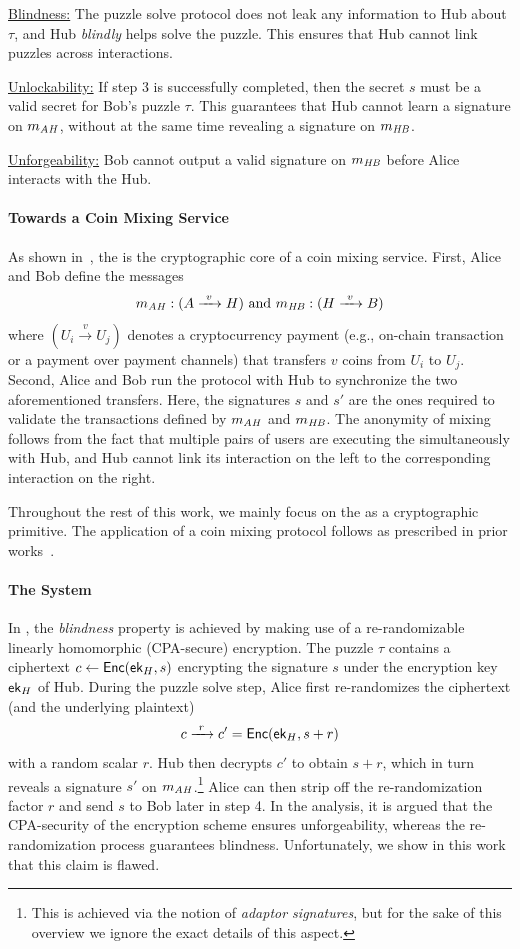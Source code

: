 \smallskip\noindent\underline{Blindness:} The puzzle solve protocol does not leak any information to Hub about $\tau$, and Hub \emph{blindly} helps solve the puzzle. This ensures that Hub cannot link puzzles across interactions.

\smallskip\noindent\underline{Unlockability:} If step 3 is successfully completed, then the secret $s$ must be a valid secret for  Bob's puzzle $\tau$. This guarantees that Hub cannot learn a signature on $m_{\mathit{AH}}$, without at the same time revealing a signature on $m_{\mathit{HB}}$.

\smallskip\noindent\underline{Unforgeability:} Bob cannot output a valid signature on $m_{\mathit{HB}}$ before Alice interacts with the Hub.


{\paragraph{Towards a Coin Mixing Service}
As shown in~\cite{NDSS:HABSG17,SP:TaiMorMaf21},  the \syncpuzzle is the cryptographic core of a coin mixing service. First, Alice and Bob define the messages $$m_{\mathit{AH}}: (A \xrightarrow{~v~} H) \text{ and }m_{\mathit{HB}}: (H \xrightarrow{~v~} B)$$ where $(U_i \xrightarrow{~v~} U_j)$ denotes a cryptocurrency payment (e.g., on-chain transaction or a payment over payment channels) that transfers $v$ coins from $U_i$ to $U_j$. Second, Alice and Bob run the \syncpuzzle protocol with Hub to synchronize the two aforementioned transfers. Here, 
the signatures $s$ and $s'$ are the ones required to validate the transactions defined by $m_{\mathit{AH}}$ and $m_{\mathit{HB}}$. The anonymity of mixing follows from the fact that multiple pairs of users are executing the \syncpuzzle simultaneously with Hub, and Hub cannot link its interaction on the left to the corresponding interaction on the right.}
Throughout the rest of this work, we mainly focus on the \syncpuzzle as a cryptographic primitive. The application of a coin mixing protocol follows as prescribed in prior works~\cite{NDSS:HABSG17,SP:TaiMorMaf21}.


\paragraph{The \aal System} In \aal, the \emph{blindness} property is achieved by making use of a re-randomizable linearly homomorphic (CPA-secure) encryption. The puzzle $\tau$ contains a ciphertext $c \gets {\mathsf{Enc}}(\mathsf{ek}_H,\allowbreak s)$ encrypting the signature $s$ under the encryption key $\mathsf{ek}_H$ of Hub. During the puzzle solve step, Alice first re-randomizes the ciphertext (and the underlying plaintext)
$$
c \xrightarrow{~r~} c' = {\mathsf{Enc}}(\mathsf{ek}_H, s + r)
$$
with a random scalar $r$. Hub then decrypts $c'$ to obtain $s+r$, which in turn reveals a signature $s'$ on $m_{\mathit{AH}}$.\footnote{This is achieved via the notion of \emph{adaptor signatures}, but for the sake of this overview we ignore the exact details of this aspect.} Alice can then strip off the re-randomization factor $r$ and send $s$ to Bob later in step 4. In the analysis, it is argued that the CPA-security of the encryption scheme ensures unforgeability, whereas the re-randomization process guarantees blindness. Unfortunately, we show in this work that this claim is flawed.

